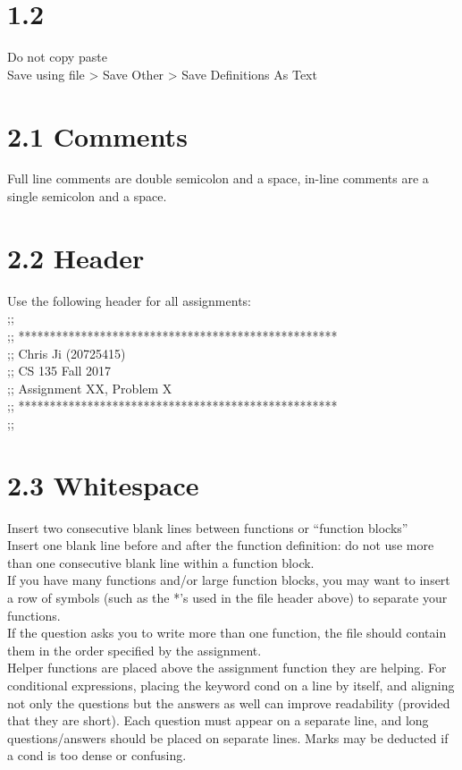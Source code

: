 \documentclass{article}     %
\begin{document}
\section*{1.2} 
Do not copy paste 
\\
Save using file > Save Other > Save Definitions As Text

\section*{2.1 Comments}
Full line comments are double semicolon and a space, in-line comments are a 
single semicolon and a space.

\section*{2.2 Header}
Use the following header for all assignments: \\
;;\\
;; ***************************************************\\
;; Chris Ji (20725415)\\
;; CS 135 Fall 2017\\ 
;; Assignment XX, Problem X\\
;; ***************************************************\\
;;\\

\section*{2.3 Whitespace}
Insert two consecutive blank lines between functions or “function blocks”\\
Insert one blank line before and after the function definition: do not use more than one consecutive
blank line within a function block. \\
If you have many functions and/or large function blocks, you may want to insert a row of symbols (such as the *’s used in
the file header above) to separate your functions. \\
If the question asks you to write more than one function, the file should contain them in the order specified by the
assignment. \\
Helper functions are placed above the assignment function they are
helping. 
For conditional expressions, placing the keyword cond on a line by itself, and
aligning not only the questions but the answers as well can improve readability
(provided that they are short). Each question must appear on a separate line, and long questions/answers
should be placed on separate lines. Marks may be deducted if a cond is too dense
or confusing.\\
\end{document}
